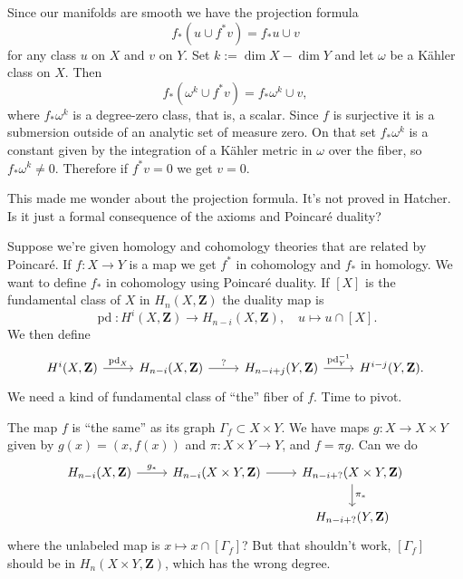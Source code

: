 \documentclass[11pt]{amsart}
\theoremstyle{definition}
\def\ZZ{\mathbf{Z}}
\begin{document}
Since our manifolds are smooth we have the projection formula
\[
f_*( u \cup f^* v) = f_* u \cup v
\]
for any class $u$ on $X$ and $v$ on $Y$.
Set $k := \dim X - \dim Y$ and let $\omega$ be a K\"ahler class on $X$.
Then
\[
f_*(\omega^k \cup f^* v) = f_* \omega^k \cup v,
\]
where $f_* \omega^k$ is a degree-zero class, that is, a scalar.
Since $f$ is surjective it is a submersion outside of an analytic set of measure zero.
On that set $f_* \omega^k$ is a constant given by the integration of a K\"ahler metric in $\omega$ over the fiber, so $f_* \omega^k \not= 0$.
Therefore if $f^* v = 0$ we get $v = 0$.

This made me wonder about the projection formula.
It's not proved in Hatcher.
Is it just a formal consequence of the axioms and Poincar\'e duality?

Suppose we're given homology and cohomology theories that are related by Poincar\'e.
If $f : X \to Y$ is a map we get $f^*$ in cohomology and $f_*$ in homology.
We want to define $f_*$ in cohomology using Poincar\'e duality.
If $[X]$ is the fundamental class of $X$ in $H_n(X,\ZZ)$ the duality map is
\[
\operatorname{pd}: H^i(X,\ZZ) \to H_{n-i}(X,\ZZ),
\quad
u \mapsto u \cap [X].
\]
We then define
\[
\begin{tikzcd}
H^i(X,\ZZ) \ar[r,"\operatorname{pd}_X"] &
H_{n-i}(X,\ZZ) \ar[r,"?"] &
H_{n-i+j}(Y,\ZZ) \ar[r,"\operatorname{pd}_Y^{-1}"] &
H^{i-j}(Y,\ZZ).
\end{tikzcd}
\]
We need a kind of fundamental class of ``the'' fiber of $f$.
Time to pivot.

The map $f$ is ``the same'' as its graph $\Gamma_f \subset X \times Y$.
We have maps $g: X \to X \times Y$ given by $g(x) = (x, f(x))$ and $\pi : X \times Y \to Y$, and $f = \pi g$.
Can we do
\[
\begin{tikzcd}
H_{n-i}(X, \ZZ) \ar[r,"g_*"] &
H_{n-i}(X \times Y, \ZZ) \ar[r] &
H_{n-i+?}(X \times Y, \ZZ) \ar[d,"\pi_*"]
\\
& & H_{n-i+?}(Y, \ZZ)
\end{tikzcd}
\]
where the unlabeled map is $x \mapsto x \cap [\Gamma_f]$?
But that shouldn't work, $[\Gamma_f]$ should be in $H_n(X\times Y,\ZZ)$, which has the wrong degree.
\end{document}
